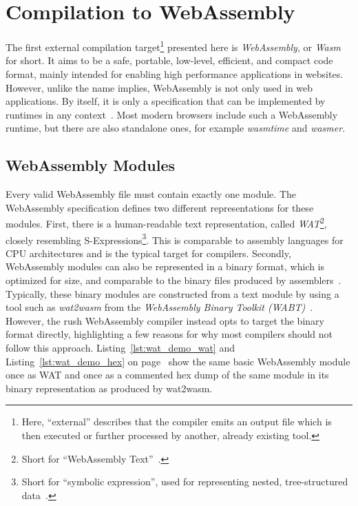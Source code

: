 \newpage
\section{Compilation to WebAssembly}\label{sec:wasm}

The first external compilation target\footnote{Here, \enquote{external} describes that the compiler emits an output file which is then executed or further processed by another, already existing tool.} presented here is \emph{WebAssembly}, or \emph{Wasm} for short.
It aims to be a safe, portable, low-level, efficient, and compact code format, mainly intended for enabling high performance applications in websites.
However, unlike the name implies, WebAssembly is not only used in web applications.
By itself, it is only a specification that can be implemented by runtimes in any context~\cite[Section~1.1]{WasmSpec}.
Most modern browsers include such a WebAssembly runtime, but there are also standalone ones, for example \emph{wasmtime} and \emph{wasmer}.

\subsection{WebAssembly Modules}

Every valid WebAssembly file must contain exactly one module.
The WebAssembly specification defines two different representations for these modules.
First, there is a human-readable text representation, called \emph{WAT}\footnote{Short for \enquote{WebAssembly Text}~\cite[p.~40]{Sendil2022-fy}.}, closely resembling S-Expressions\footnote{Short for \enquote{symbolic expression}, used for representing  nested, tree-structured data~\cite[p.~41]{Sendil2022-fy}.}.
This is comparable to assembly languages for CPU architectures and is the typical target for compilers.
Secondly, WebAssembly modules can also be represented in a binary format, which is optimized for size, and comparable to the binary files produced by assemblers~\cite[pp.~40--44]{Sendil2022-fy}.
Typically, these binary modules are constructed from a text module by using a tool such as \emph{wat2wasm} from the \emph{WebAssembly Binary Toolkit (WABT)}~\cite[p.~57]{Sendil2022-fy}.
However, the rush WebAssembly compiler instead opts to target the binary format directly, highlighting a few reasons for why most compilers should not follow this approach.
Listing~\ref{lst:wat_demo_wat} and Listing~\ref{lst:wat_demo_hex} on page~\pageref{lst:wat_demo_wat} show the same basic WebAssembly module once as WAT and once as a commented hex dump of the same module in its binary representation as produced by wat2wasm.

